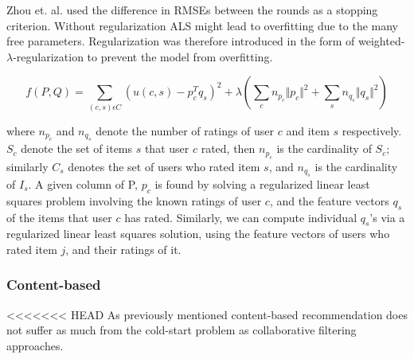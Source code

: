 Zhou et. al. \cite{Zhou2008} used the difference in RMSEs between the rounds as a stopping criterion. Without regularization ALS might lead to overfitting due to the many free parameters. Regularization was therefore introduced in the form of weighted-$\lambda$-regularization to prevent the model from overfitting.

\begin{equation}
f(P, Q) = \sum_{(c,s)\epsilon C} (u(c,s) - p^{T}_{c}q_{s})^{2} + \lambda (\sum_{c} n_{p_{c}} \Vert p_{c} \Vert ^{2} + \sum_{s} n_{q_{s}} \Vert q_{s} \Vert ^{2})
\label{WeightedLamba}
\end{equation}

where $n_{p_{c}}$ and $n_{q_{s}}$ denote the number of ratings of user $c$ and item $s$ respectively. $S_{c}$ denote the set of items $s$ that user $c$ rated, then $n_{p_{c}}$ is the cardinality of $S_{c}$; similarly $C_{s}$ denotes the set of users who rated item $s$, and $n_{q_{s}}$ is the cardinality of $I_{s}$. A given column of P, $p_{c}$ is found by solving a regularized linear least squares problem involving the known ratings of user $c$, and the feature vectors $q_{s}$ of the items that user $c$ has rated. Similarly, we can compute individual $q_{s}$'s via a regularized linear least squares solution, using the feature vectors of users who rated item $j$, and their ratings of it.


\subsubsection{Content-based}

<<<<<<< HEAD
As previously mentioned content-based recommendation does not suffer as much from the cold-start problem as
collaborative filtering approaches. 

